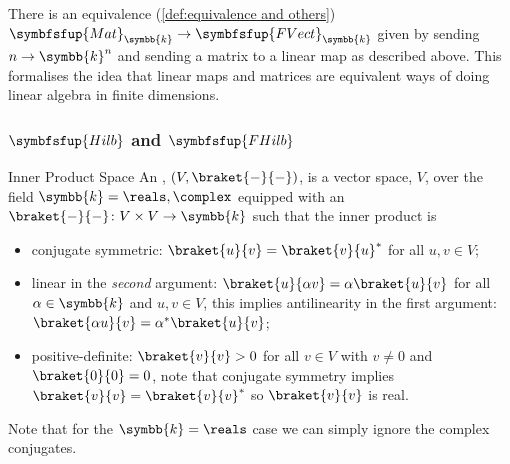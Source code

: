 \documentclass[fleqn]{NotesClass}
\makeatletter
\newcommand{\c@egory}[1]{\symbfsfup{#1}}
\renewcommand{\field}{\symbb{k}}
\newcommand{\Mat}[1][\field]{{\c@egory{Mat}_{#1}}}
\newcommand{\FVect}[1][\field]{{\c@egory{FVect}_{#1}}}
\newcommand{\Hilb}{\c@egory{Hilb}}
\newcommand{\FHilb}{\c@egory{FHilb}}
\makeatother
\begin{document}
    There is an equivalence (\cref{def:equivalence and others}) \(\Mat \to \FVect\) given by sending \(n \to \field^n\) and sending a matrix to a linear map as described above.
    This formalises the idea that linear maps and matrices are equivalent ways of doing linear algebra in finite dimensions.
    
    \subsubsection{\texorpdfstring{\(\Hilb\) and \(\FHilb\)}{Hilb and FHilb}}
    \begin{dfn}{Inner Product Space}{}
        An , \((V, \braket{-}{-})\), is a vector space, \(V\), over the field \(\field = \reals, \complex\) equipped with an  \(\braket{-}{-} \colon V \times V \to \field\) such that the inner product is
        \begin{itemize}
            \item conjugate symmetric: \(\braket{u}{v} = \braket{v}{u}^*\) for all \(u, v \in V\);
            \item linear in the \emph{second} argument: \(\braket{u}{\alpha v} = \alpha\braket{u}{v}\) for all \(\alpha \in \field\) and \(u, v \in V\), this implies antilinearity in the first argument: \(\braket{\alpha u}{v} = \alpha^*\braket{u}{v}\);
            \item positive-definite: \(\braket{v}{v} > 0\) for all \(v \in V\) with \(v \ne 0\) and \(\braket{0}{0} = 0\), note that conjugate symmetry implies \(\braket{v}{v} = \braket{v}{v}^*\) so \(\braket{v}{v}\) is real.
        \end{itemize}
        Note that for the \(\field = \reals\) case we can simply ignore the complex conjugates.
    \end{dfn}
    
\end{document}
